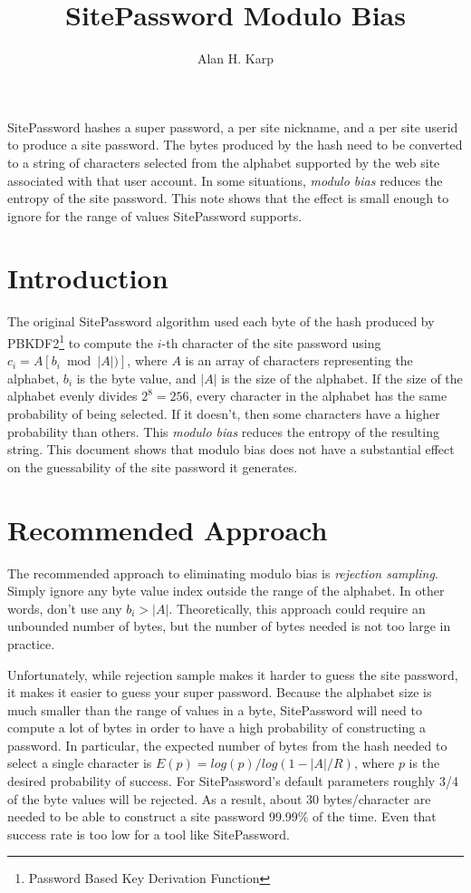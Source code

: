 \documentclass[11pt, oneside]{article}   	%
\title{SitePassword Modulo Bias}
\author{Alan H. Karp}
\begin{document}
\maketitle
\abstract

SitePassword hashes  a super password, a per site nickname, and a per site userid to produce a site password.  The bytes produced by the hash need to be converted to a string of characters selected from the alphabet supported by the web site associated with that user account.  In some situations, {\em modulo bias} reduces the entropy of the site password.  This note shows that the effect is small enough to ignore for the range of values SitePassword supports.

\section{Introduction}

The original SitePassword algorithm used each byte of the hash produced by PBKDF2\footnote{Password Based Key Derivation Function} to compute the $i$-th character of the site password using $c_i = A[b_i  \bmod  |A|)]$, where $A$ is an array of characters representing the alphabet, $b_i$ is the byte value, and $|A|$ is the size of the alphabet.  If the size of the alphabet evenly divides $2^8 = 256$, every character in the alphabet has the same probability of being selected.  If it doesn't, then some characters have a higher probability than others.  This {\em modulo bias} reduces the entropy of the resulting string.  This document shows that modulo bias does not have a substantial effect on the guessability of the site password it generates.

\section{Recommended Approach}

The recommended approach to eliminating modulo bias is {\em rejection sampling}.  Simply ignore any byte value index outside the range of the alphabet.  In other words, don't use any $b_i > |A|$.  Theoretically, this approach could require an unbounded number of bytes, but the number of bytes needed is not too large in practice.  

Unfortunately, while rejection sample makes it harder to guess the site password, it makes it easier to guess your super password.  Because the alphabet size is much smaller than the range of values in a byte, SitePassword will need to compute a lot of bytes in order to have a high probability of constructing a password.  In particular, the expected number of bytes from the hash needed to select a single character is $E(p) = log(p)/log(1-|A|/R)$, where $p$ is the desired probability of success.  For SitePassword's default parameters roughly 3/4 of the byte values will be rejected.  As a result, about 30 bytes/character are needed to be able to construct a site password 99.99\% of the time.  Even that success rate is too low for a tool like SitePassword.
\end{document}
